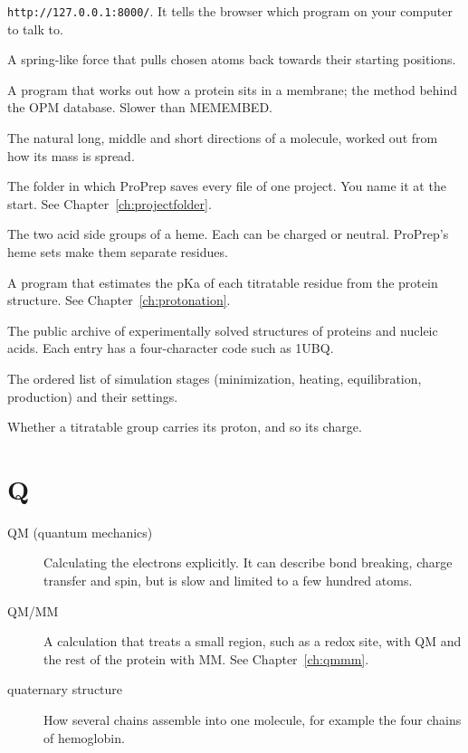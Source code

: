 \begin{description}
  \texttt{http://127.0.0.1:8000/}. It tells the browser which program on your
  computer to talk to.
\item[positional restraint] A spring-like force that pulls chosen atoms back
  towards their starting positions.
\item[PPM3] A program that works out how a protein sits in a membrane; the
  method behind the OPM database. Slower than MEMEMBED.
\item[principal axes] The natural long, middle and short directions of a
  molecule, worked out from how its mass is spread.
\item[project folder] The folder in which ProPrep saves every file of one
  project. You name it at the start. See Chapter~\ref{ch:projectfolder}.
\item[propionates] The two acid side groups of a heme. Each can be charged or
  neutral. ProPrep's heme sets make them separate residues.
\item[PROPKA] A program that estimates the pKa of each titratable residue from
  the protein structure. See Chapter~\ref{ch:protonation}.
\item[Protein Data Bank (PDB)] The public archive of experimentally solved
  structures of proteins and nucleic acids. Each entry has a four-character
  code such as 1UBQ.
\item[protocol] The ordered list of simulation stages (minimization, heating,
  equilibration, production) and their settings.
\item[protonation state] Whether a titratable group carries its proton, and
  so its charge.
\end{description}

\section*{Q}

\begin{description}
\item[QM (quantum mechanics)] Calculating the electrons explicitly. It can
  describe bond breaking, charge transfer and spin, but is slow and limited
  to a few hundred atoms.
\item[QM/MM] A calculation that treats a small region, such as a redox site,
  with QM and the rest of the protein with MM. See Chapter~\ref{ch:qmmm}.
\item[quaternary structure] How several chains assemble into one molecule,
  for example the four chains of hemoglobin.
\end{description}

